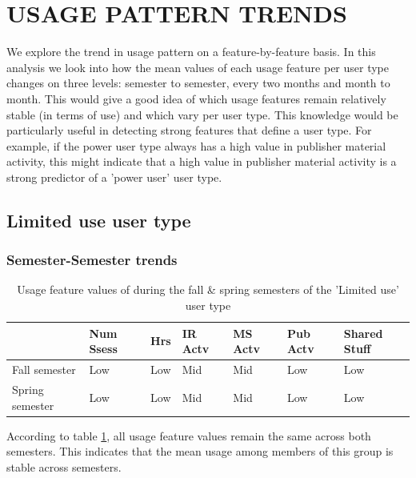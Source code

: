 \documentclass{acm_proc_article-sp}
\begin{document}
\section{USAGE PATTERN TRENDS}
We explore the trend in usage pattern on a feature-by-feature basis. In this analysis we look into how the mean values of each usage feature per user type changes on three levels: semester to semester, every two months and month to month. This would give a good idea of which usage features remain relatively stable (in terms of use) and which vary per user type. This knowledge would be particularly useful in detecting strong features that define a user type. For example, if the power user type always has a high value in  publisher material activity, this  might indicate that a high value in publisher material activity is a strong predictor of a 'power user' user type.
\subsection{Limited use user type}
\subsubsection{Semester-Semester trends}
\begin{table}
\caption{Usage feature values of during the fall \& spring semesters of the 'Limited use' user type}
\label{cluster0month}
\begin{tabular}{|p{1.5cm}|p{0.6cm}|p{0.6cm}|p{0.6cm}|p{0.6cm}|p{0.8cm}|p{0.8cm}|}
 & Num Ssess & Hrs & IR Actv & MS Actv & Pub Actv & Shared Stuff \\ \hline
 Fall  semester & Low & Low  & Mid & Mid & Low & Low \\ \hline
Spring semester & Low & Low  & Mid & Mid & Low & Low \\ \hline
\end{tabular}
\end{table}
According to table \ref{cluster0month}, all usage feature values remain the same across both semesters. This indicates that the mean usage among members of this group is stable across semesters.
\end{document}
